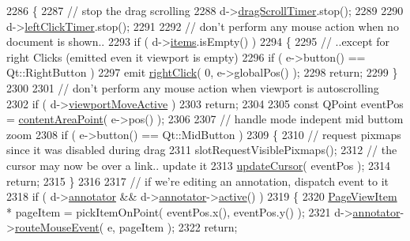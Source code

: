 \begin{DoxyCode}
2286 \{
2287     \textcolor{comment}{// stop the drag scrolling}
2288     d->\hyperlink{classPageViewPrivate_a2aefc2e5ac5f4824c39593264277ad6a}{dragScrollTimer}.stop();
2289 
2290     d->\hyperlink{classPageViewPrivate_ac0d8482663a19cc6798a2c3b39f78d0e}{leftClickTimer}.stop();
2291 
2292     \textcolor{comment}{// don't perform any mouse action when no document is shown..}
2293     \textcolor{keywordflow}{if} ( d->\hyperlink{classPageViewPrivate_ad90c795dead9abfaa5818a94e00435bc}{items}.isEmpty() )
2294     \{
2295         \textcolor{comment}{// ..except for right Clicks (emitted even it viewport is empty)}
2296         \textcolor{keywordflow}{if} ( e->button() == Qt::RightButton )
2297             emit \hyperlink{classPageView_a51ac8814a8f47fd02ac0b61627ad164f}{rightClick}( 0, e->globalPos() );
2298         \textcolor{keywordflow}{return};
2299     \}
2300 
2301     \textcolor{comment}{// don't perform any mouse action when viewport is autoscrolling}
2302     \textcolor{keywordflow}{if} ( d->\hyperlink{classPageViewPrivate_acc47dfc95cad4f126c4dbd3e8f31e43b}{viewportMoveActive} )
2303         \textcolor{keywordflow}{return};
2304 
2305     \textcolor{keyword}{const} QPoint eventPos = \hyperlink{classPageView_a7f432d3d6d05c69b568ad66a9c232cd7}{contentAreaPoint}( e->pos() );
2306 
2307     \textcolor{comment}{// handle mode indepent mid buttom zoom}
2308     \textcolor{keywordflow}{if} ( e->button() == Qt::MidButton )
2309     \{
2310         \textcolor{comment}{// request pixmaps since it was disabled during drag}
2311         slotRequestVisiblePixmaps();
2312         \textcolor{comment}{// the cursor may now be over a link.. update it}
2313         \hyperlink{classPageView_a0054ba6d2967fa31dea42dcc9d9020b6}{updateCursor}( eventPos );
2314         \textcolor{keywordflow}{return};
2315     \}
2316 
2317     \textcolor{comment}{// if we're editing an annotation, dispatch event to it}
2318     \textcolor{keywordflow}{if} ( d->\hyperlink{classPageViewPrivate_a07bad73b61f6b400411aacc7e2e820a0}{annotator} && d->\hyperlink{classPageViewPrivate_a07bad73b61f6b400411aacc7e2e820a0}{annotator}->\hyperlink{classPageViewAnnotator_ae7fcfee911a4eb7811865863d852ffac}{active}() )
2319     \{
2320         \hyperlink{classPageViewItem}{PageViewItem} * pageItem = pickItemOnPoint( eventPos.x(), eventPos.y() );
2321         d->\hyperlink{classPageViewPrivate_a07bad73b61f6b400411aacc7e2e820a0}{annotator}->\hyperlink{classPageViewAnnotator_a6cd952408052c6d7de1c1111d61266b0}{routeMouseEvent}( e, pageItem );
2322         \textcolor{keywordflow}{return};

\end{DoxyCode}
